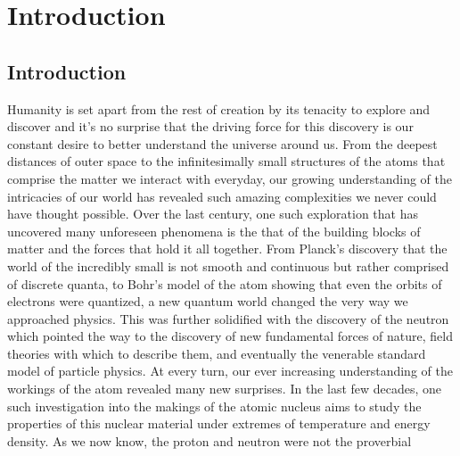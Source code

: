 \chapter{Introduction}


\section{Introduction}
Humanity is set apart from the rest of creation by its tenacity to explore and discover and it's no surprise that the driving force for this discovery is our constant desire to better understand the universe around us. From the deepest distances of outer space to the infinitesimally small structures of the atoms that comprise the matter we interact with everyday, our growing understanding of the intricacies of our world has revealed such amazing complexities we never could have thought possible. Over the last century, one such exploration that has uncovered many unforeseen phenomena is the that of the building blocks of matter and the forces that hold it all together. From Planck's discovery that the world of the incredibly small is not smooth and continuous but rather comprised of discrete quanta, to Bohr's model of the atom showing that even the orbits of electrons were quantized, a new quantum world changed the very way we approached physics. This was further solidified with the discovery of the neutron which pointed the way to the discovery of new fundamental forces of nature, field theories with which to describe them, and eventually the venerable standard model of particle physics. At every turn, our ever increasing understanding of the workings of the atom revealed many new surprises. In the last few decades, one such investigation into the makings of the atomic nucleus aims to study the properties of this nuclear material under extremes of temperature and energy density. As we now know, the proton and neutron were not the proverbial 
